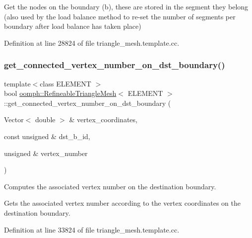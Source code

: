 Get the nodes on the boundary (b), these are stored in the segment they belong (also used by the load balance method to re-\/set the number of segments per boundary after load balance has taken place) 



Definition at line 28824 of file triangle\+\_\+mesh.\+template.\+cc.

\mbox{\label{classoomph_1_1RefineableTriangleMesh_a097fbc660755f2127f575580d086c3aa}} 
\subsubsection{\texorpdfstring{get\+\_\+connected\+\_\+vertex\+\_\+number\+\_\+on\+\_\+dst\+\_\+boundary()}{get\_connected\_vertex\_number\_on\_dst\_boundary()}}
{\footnotesize\ttfamily template$<$class E\+L\+E\+M\+E\+NT $>$ \\
bool \hyperlink{classoomph_1_1RefineableTriangleMesh}{oomph\+::\+Refineable\+Triangle\+Mesh}$<$ E\+L\+E\+M\+E\+NT $>$\+::get\+\_\+connected\+\_\+vertex\+\_\+number\+\_\+on\+\_\+dst\+\_\+boundary (\begin{DoxyParamCaption}\item[{Vector$<$ double $>$ \&}]{vertex\+\_\+coordinates,  }\item[{const unsigned \&}]{dst\+\_\+b\+\_\+id,  }\item[{unsigned \&}]{vertex\+\_\+number }\end{DoxyParamCaption})\hspace{0.3cm}{\ttfamily [protected]}}



Computes the associated vertex number on the destination boundary. 

Gets the associated vertex number according to the vertex coordinates on the destination boundary. 

Definition at line 33824 of file triangle\+\_\+mesh.\+template.\+cc.



